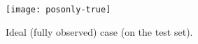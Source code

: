 \begin{answer}
\begin{figure}[H]
	\centering
	\texttt{[image: posonly-true]}
	\caption{Ideal (fully observed) case (on the test set).}
\end{figure}
\end{answer}
